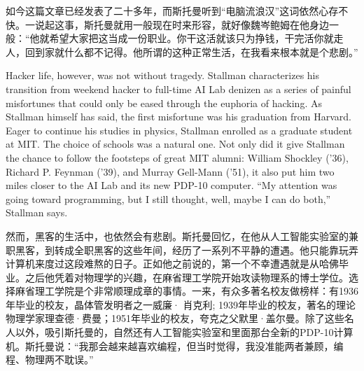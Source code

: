 \ifdefined\chs
如今这篇文章已经发表了二十多年，而斯托曼听到``电脑流浪汉''这词依然心存不快。一说起这事，斯托曼就用一般现在时来形容，就好像魏岑鲍姆在他身边一般：``他就希望大家把这当成一份职业。你干这活就该只为挣钱，干完活你就走人，回到家就什么都不记得。他所谓的这种正常生活，在我看来根本就是个悲剧。''
\fi

\ifdefined\eng
Hacker life, however, was not without tragedy. Stallman characterizes his transition from weekend hacker to full-time AI Lab denizen as a series of painful misfortunes that could only be eased through the euphoria of hacking. As Stallman himself has said, the first misfortune was his graduation from Harvard. Eager to continue his studies in physics, Stallman enrolled as a graduate student at MIT. The choice of schools was a natural one. Not only did it give Stallman the chance to follow the footsteps of great MIT alumni: William Shockley ('36), Richard P. Feynman ('39), and Murray Gell-Mann ('51), it also put him two miles closer to the AI Lab and its new PDP-10 computer. ``My attention was going toward programming, but I still thought, well, maybe I can do both,'' Stallman says.
\fi

\ifdefined\chs
然而，黑客的生活中，也依然会有悲剧。斯托曼回忆，在他从人工智能实验室的兼职黑客，到转成全职黑客的这些年间，经历了一系列不平静的遭遇。他只能靠玩弄计算机来度过这段难熬的日子。正如他之前说的，第一个不幸遭遇就是从哈佛毕业。之后他凭着对物理学的兴趣，在麻省理工学院开始攻读物理系的博士学位。选择麻省理工学院是个非常顺理成章的事情。一来，有众多著名校友做榜样：有1936年毕业的校友，晶体管发明者之一威廉· 肖克利; 1939年毕业的校友，著名的理论物理学家理查德·费曼；1951年毕业的校友，夸克之父默里·盖尔曼。除了这些名人以外，吸引斯托曼的，自然还有人工智能实验室和里面那台全新的PDP-10计算机。斯托曼说：``我那会越来越喜欢编程，但当时觉得，我没准能两者兼顾，编程、物理两不耽误。''
\fi

